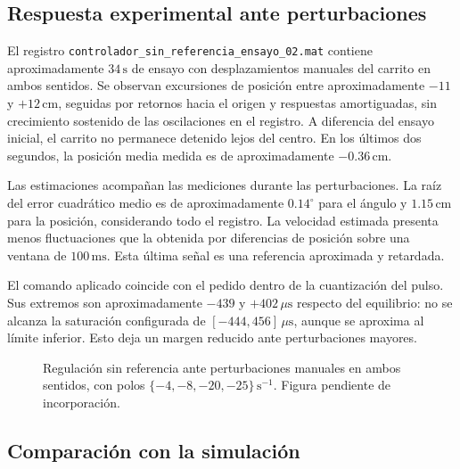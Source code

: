 \documentclass[a4paper, twoside, 10pt, spanish]{article}
\numberwithin{table}{section}
\begin{document}
\subsection{Respuesta experimental ante perturbaciones}
El registro \texttt{controlador\_sin\_referencia\_ensayo\_02.mat} contiene aproximadamente $34\,\mathrm{s}$ de ensayo con desplazamientos manuales del carrito en ambos sentidos. Se observan excursiones de posición entre aproximadamente $-11$ y $+12\,\mathrm{cm}$, seguidas por retornos hacia el origen y respuestas amortiguadas, sin crecimiento sostenido de las oscilaciones en el registro. A diferencia del ensayo inicial, el carrito no permanece detenido lejos del centro. En los últimos dos segundos, la posición media medida es de aproximadamente $-0.36\,\mathrm{cm}$.

Las estimaciones acompañan las mediciones durante las perturbaciones. La raíz del error cuadrático medio es de aproximadamente $0.14^\circ$ para el ángulo y $1.15\,\mathrm{cm}$ para la posición, considerando todo el registro. La velocidad estimada presenta menos fluctuaciones que la obtenida por diferencias de posición sobre una ventana de $100\,\mathrm{ms}$. Esta última señal es una referencia aproximada y retardada.

El comando aplicado coincide con el pedido dentro de la cuantización del pulso. Sus extremos son aproximadamente $-439$ y $+402\,\mu\mathrm{s}$ respecto del equilibrio: no se alcanza la saturación configurada de $[-444,456]\,\mu\mathrm{s}$, aunque se aproxima al límite inferior. Esto deja un margen reducido ante perturbaciones mayores.

\begin{figure}[htbp]
    \centering
    \caption{Regulación sin referencia ante perturbaciones manuales en ambos sentidos, con polos $\{-4,-8,-20,-25\}\,\mathrm{s}^{-1}$. Figura pendiente de incorporación.}
    \label{fig:regulacion-sin-referencia-ensayo02}
\end{figure}

\subsection{Comparación con la simulación}
\end{document}
